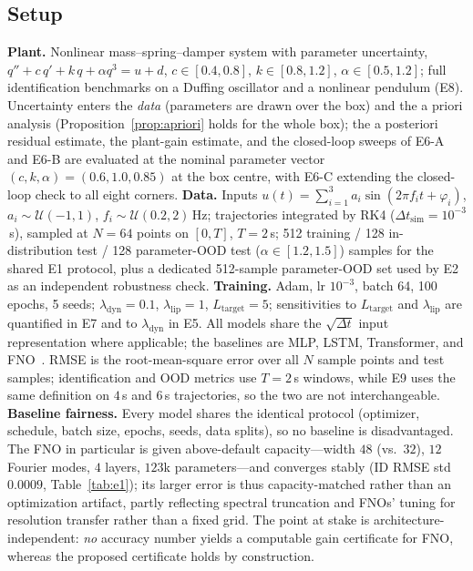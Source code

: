 \documentclass[11pt,sagev,times]{sagej}
\newcommand{\Ltarget}{L_{\mathrm{target}}}
\begin{document}
\subsection{Setup}
\textbf{Plant.} Nonlinear mass--spring--damper system with parameter
uncertainty,
$q''+c\,q'+k\,q+\alpha q^3=u+d$,
$c\in[0.4,0.8]$, $k\in[0.8,1.2]$, $\alpha\in[0.5,1.2]$; full identification
benchmarks on a Duffing oscillator and a nonlinear pendulum (E8). Uncertainty
enters the \emph{data} (parameters are drawn over the box) and the a priori
analysis (Proposition~\ref{prop:apriori} holds for the whole box); the
a posteriori residual estimate, the plant-gain estimate, and the closed-loop
sweeps of E6-A and E6-B are evaluated at the nominal parameter vector
$(c,k,\alpha)=(0.6,1.0,0.85)$ at the box centre, with E6-C extending the
closed-loop check to all eight corners. \textbf{Data.} Inputs
$u(t)=\sum_{i=1}^{3}a_i\sin(2\pi f_i t+\varphi_i)$,
$a_i\sim\mathcal{U}(-1,1)$, $f_i\sim\mathcal{U}(0.2,2)$\,Hz; trajectories
integrated by RK4 ($\Delta t_{\mathrm{sim}}=10^{-3}$\,s), sampled at $N=64$
points on $[0,T]$, $T=2$\,s; 512 training / 128 in-distribution test / 128
parameter-OOD test ($\alpha\in[1.2,1.5]$) samples for the shared E1
protocol, plus a dedicated 512-sample parameter-OOD set used by E2 as an
independent robustness check.
\textbf{Training.} Adam, lr $10^{-3}$, batch 64, 100 epochs, 5 seeds;
$\lambda_{\mathrm{dyn}}=0.1$, $\lambda_{\mathrm{lip}}=1$, $\Ltarget=5$;
sensitivities to $\Ltarget$ and $\lambda_{\mathrm{lip}}$ are quantified in
E7 and to $\lambda_{\mathrm{dyn}}$ in E5.
All models share the $\sqrt{\Delta t}$ input representation where applicable;
the baselines are MLP, LSTM, Transformer, and FNO~\citep{li2021fno}.
RMSE is the root-mean-square error over all $N$ sample points and test
samples; identification and OOD metrics use $T=2$\,s windows, while E9 uses
the same definition on $4$\,s and $6$\,s trajectories, so the two are not
interchangeable.
\textbf{Baseline fairness.} Every model shares the identical protocol
(optimizer, schedule, batch size, epochs, seeds, data splits), so no baseline
is disadvantaged. The FNO in particular is given above-default
capacity---width $48$ (vs.\ $32$), $12$ Fourier modes, $4$ layers, $123$k
parameters---and converges stably (ID RMSE std $0.0009$,
Table~\ref{tab:e1}); its larger error is thus
capacity-matched rather than an optimization artifact, partly reflecting
spectral truncation and FNOs' tuning for resolution
transfer rather than a fixed grid. The point at stake is
architecture-independent: \emph{no} accuracy number yields a
computable gain certificate for FNO, whereas the proposed certificate holds by
construction.
\end{document}
